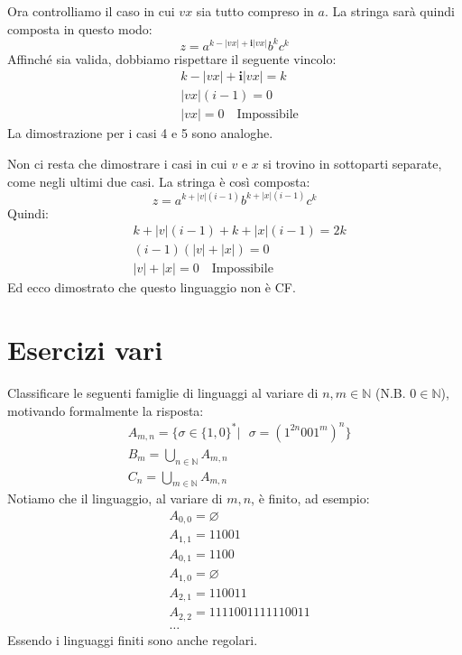 \documentclass[a4paper,oneside]{scrbook}
\begin{document}
Ora controlliamo il caso in cui $vx$ sia tutto compreso in $a$. La stringa sarà quindi composta in questo modo:
\begin{equation*}
	z=a^{k-|vx|+\textbf{i}|vx|}b^kc^k
\end{equation*}
Affinché sia valida, dobbiamo rispettare il seguente vincolo:
\begin{align*}
	&k-|vx|+\textbf{i}|vx|=k\\
	&|vx|(i-1)=0\\
	&|vx|=0 \quad \text{Impossibile}
\end{align*}
La dimostrazione per i casi 4 e 5 sono analoghe.

Non ci resta che dimostrare i casi in cui $v$ e $x$ si trovino in sottoparti separate, come negli ultimi due casi.
La stringa è così composta:
\begin{equation*}
	z=a^{k+|v|(i-1)}b^{k+|x|(i-1)}c^k
\end{equation*}
Quindi:
\begin{align*}
	&k+|v|(i-1)+k+|x|(i-1)=2k\\
	&(i-1)(|v|+|x|)=0\\
	&|v|+|x|=0 \quad \text{Impossibile}
\end{align*}
Ed ecco dimostrato che questo linguaggio non è CF.

\chapter{Esercizi vari}
Classificare le seguenti famiglie di linguaggi al variare di $n,m \in \mathbb{N}$ (N.B. $0\in\mathbb{N}$), motivando formalmente la risposta:
\begin{align*}
	&A_{m,n} =\{ \sigma \in \{1,0\}^* | \text{ } \sigma = (1^{2n}001^m)^n \}\\
	&B_m = \bigcup_{n\in\mathbb{N}} A_{m,n}\\
	&C_n = \bigcup_{m\in\mathbb{N}} A_{m,n}
\end{align*}
Notiamo che il linguaggio, al variare di $m,n$, è finito, ad esempio:
\begin{align*}
	&A_{0,0}=\varnothing\\
	&A_{1,1}=11001\\
	&A_{0,1}=1100\\
	&A_{1,0}=\varnothing\\
	&A_{2,1}=110011\\
	&A_{2,2}=1111001111110011\\
	&\dots
\end{align*}
Essendo i linguaggi finiti sono anche regolari.
\end{document}

